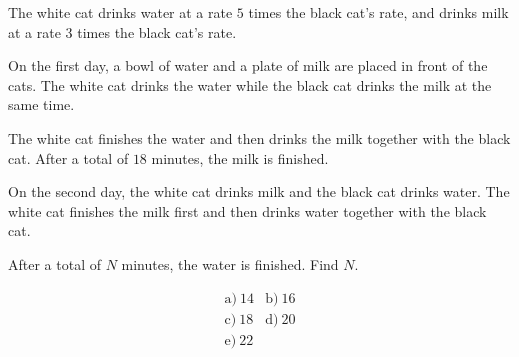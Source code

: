 The white cat drinks water at a rate \(5\) times the black cat's rate, and drinks milk at a rate \(3\) times the black cat's rate.



On the first day, a bowl of water and a plate of milk are placed in front of the cats. The white cat drinks the water while the black cat drinks the milk at the same time.



The white cat finishes the water and then drinks the milk together with the black cat. After a total of \(18\) minutes, the milk is finished.



On the second day, the white cat drinks milk and the black cat drinks water. The white cat finishes the milk first and then drinks water together with the black cat.



After a total of \(N\) minutes, the water is finished. Find \(N\).



\[
\begin{array}{ll}
\text{a)}\ 14 & \text{b)}\ 16 \\
\text{c)}\ 18 & \text{d)}\ 20 \\
\text{e)}\ 22
\end{array}
\]

